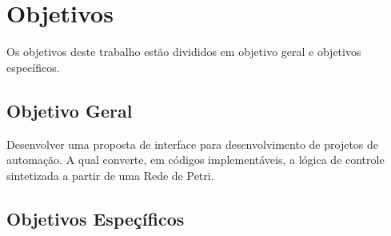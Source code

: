 




\section{Objetivos}

Os objetivos deste trabalho est\~ao divididos em objetivo geral e objetivos espec\'ificos.

\subsection{Objetivo Geral}

Desenvolver uma proposta de interface para desenvolvimento de projetos de automa\c{c}\~ao. A qual converte, em c\'odigos implement\'aveis, a l\'ogica de controle sintetizada a partir de uma Rede de Petri.

\subsection{Objetivos Espe\c{c}\'ificos}

